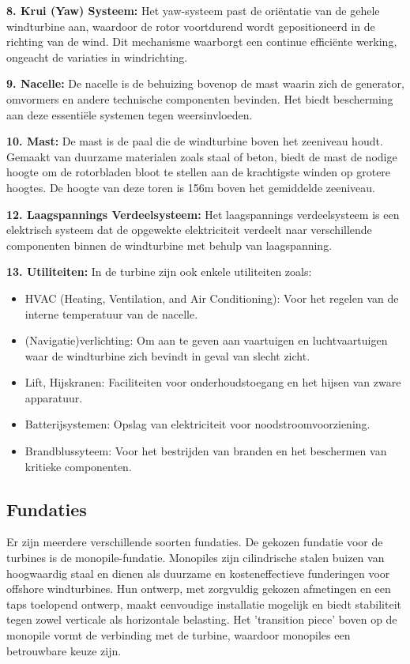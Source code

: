 \textbf{8. Krui (Yaw) Systeem:}
Het yaw-systeem past de oriëntatie van de gehele windturbine aan, waardoor de rotor voortdurend wordt gepositioneerd in de richting van de wind. Dit mechanisme waarborgt een continue efficiënte werking, ongeacht de variaties in windrichting.\cite{NREL_turbine_documentatie}

\textbf{9. Nacelle:}
De nacelle is de behuizing bovenop de mast waarin zich de generator, omvormers en andere technische componenten bevinden. Het biedt bescherming aan deze essentiële systemen tegen weersinvloeden. 

\textbf{10. Mast:}
De mast is de paal die de windturbine boven het zeeniveau houdt. Gemaakt van duurzame materialen zoals staal of beton, biedt de mast de nodige hoogte om de rotorbladen bloot te stellen aan de krachtigste winden op grotere hoogtes. De hoogte van deze toren is 156m boven het gemiddelde zeeniveau. 

\textbf{12. Laagspannings Verdeelsysteem:}
Het laagspannings verdeelsysteem is een elektrisch systeem dat de opgewekte elektriciteit verdeelt naar verschillende componenten binnen de windturbine met behulp van laagspanning.

\textbf{13. Utiliteiten:}
In de turbine zijn ook enkele utiliteiten zoals: 
\begin{itemize}
    \item HVAC (Heating, Ventilation, and Air Conditioning): Voor het regelen van de interne temperatuur van de nacelle.
    \item (Navigatie)verlichting: Om aan te geven aan vaartuigen en luchtvaartuigen waar de windturbine zich bevindt in geval van slecht zicht.
    \item Lift, Hijskranen: Faciliteiten voor onderhoudstoegang en het hijsen van zware apparatuur.
    \item Batterijsystemen: Opslag van elektriciteit voor noodstroomvoorziening.
    \item Brandblussyteem: Voor het bestrijden van branden en het beschermen van kritieke componenten.
\end{itemize}

\subsection{Fundaties}
Er zijn meerdere verschillende soorten fundaties. De gekozen fundatie voor de turbines is de monopile-fundatie. Monopiles zijn cilindrische stalen buizen van hoogwaardig staal en dienen als duurzame en kosteneffectieve funderingen voor offshore windturbines. Hun ontwerp, met zorgvuldig gekozen afmetingen en een taps toelopend ontwerp, maakt eenvoudige installatie mogelijk en biedt stabiliteit tegen zowel verticale als horizontale belasting. Het 'transition piece' boven op de monopile vormt de verbinding met de turbine, waardoor monopiles een betrouwbare keuze zijn.\cite{Monopile_Fundatie}


